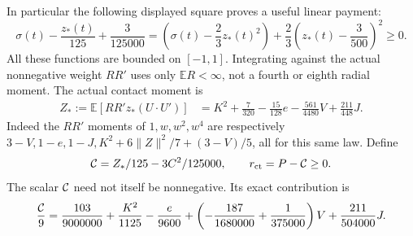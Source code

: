 \documentclass[11pt]{article}
\theoremstyle{remark}\newtheorem{remark}[theorem]{Remark}
\newcommand{\E}{\mathbb E}
\numberwithin{equation}{section}
\begin{document}
In particular the following displayed square proves a useful linear payment:
\begin{equation}\label{contact-paid}
 \sigma(t)-\frac{z_*(t)}{125}+\frac3{125000}
   =\left(\sigma(t)-\frac23z_*(t)^2\right)
       +\frac23\left(z_*(t)-\frac3{500}\right)^2\ge0.
\end{equation}
All these functions are bounded on $[-1,1]$. Integrating against the actual
nonnegative weight $RR'$ uses only $\E R<\infty$, not a fourth or eighth
radial moment. The actual contact moment is
\begin{align}\label{Zstar}
 Z_*:=\E[RR'z_*(U\cdot U')]
   &=K^2+\frac7{320}-\frac{15}{128}e
                    -\frac{561}{4480}V+\frac{211}{448}J.
\end{align}
Indeed the $RR'$ moments of $1,w,w^2,w^4$ are respectively
$3-V,1-e,1-J,K^2+6\|Z\|^2/7+(3-V)/5$, all for this same law.
Define
\begin{equation}\label{Cstar8}
 {\cal C}=Z_*/125-3C^2/125000,\qquad
 r_{\rm ct}=P-{\cal C}\ge0.
\end{equation}
The scalar ${\cal C}$ need not itself be nonnegative. Its exact contribution is
\begin{equation}\label{paid-expansion}
 \frac{{\cal C}}{9}=\frac{103}{9000000}+\frac{K^2}{1125}
 -\frac e{9600}+\left(-\frac{187}{1680000}+\frac1{375000}\right)V
                       +\frac{211}{504000}J.
\end{equation}
\end{document}

